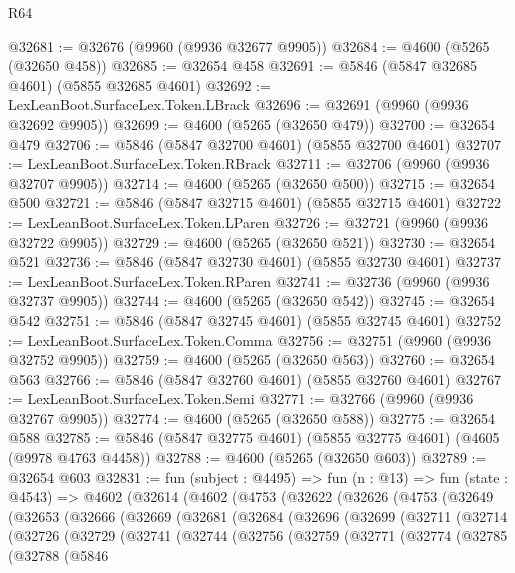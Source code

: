\begin{lexlean}{R64}
\begin{coremodule}
@32681 := @32676 (@9960 (@9936 @32677 @9905))
@32684 := @4600 (@5265 (@32650 @458))
@32685 := @32654 @458
@32691 := @5846 (@5847 @32685 @4601) (@5855 @32685 @4601)
@32692 := LexLeanBoot.SurfaceLex.Token.LBrack
@32696 := @32691 (@9960 (@9936 @32692 @9905))
@32699 := @4600 (@5265 (@32650 @479))
@32700 := @32654 @479
@32706 := @5846 (@5847 @32700 @4601) (@5855 @32700 @4601)
@32707 := LexLeanBoot.SurfaceLex.Token.RBrack
@32711 := @32706 (@9960 (@9936 @32707 @9905))
@32714 := @4600 (@5265 (@32650 @500))
@32715 := @32654 @500
@32721 := @5846 (@5847 @32715 @4601) (@5855 @32715 @4601)
@32722 := LexLeanBoot.SurfaceLex.Token.LParen
@32726 := @32721 (@9960 (@9936 @32722 @9905))
@32729 := @4600 (@5265 (@32650 @521))
@32730 := @32654 @521
@32736 := @5846 (@5847 @32730 @4601) (@5855 @32730 @4601)
@32737 := LexLeanBoot.SurfaceLex.Token.RParen
@32741 := @32736 (@9960 (@9936 @32737 @9905))
@32744 := @4600 (@5265 (@32650 @542))
@32745 := @32654 @542
@32751 := @5846 (@5847 @32745 @4601) (@5855 @32745 @4601)
@32752 := LexLeanBoot.SurfaceLex.Token.Comma
@32756 := @32751 (@9960 (@9936 @32752 @9905))
@32759 := @4600 (@5265 (@32650 @563))
@32760 := @32654 @563
@32766 := @5846 (@5847 @32760 @4601) (@5855 @32760 @4601)
@32767 := LexLeanBoot.SurfaceLex.Token.Semi
@32771 := @32766 (@9960 (@9936 @32767 @9905))
@32774 := @4600 (@5265 (@32650 @588))
@32775 := @32654 @588
@32785 := @5846 (@5847 @32775 @4601) (@5855 @32775 @4601) (@4605 (@9978 @4763 @4458))
@32788 := @4600 (@5265 (@32650 @603))
@32789 := @32654 @603
@32831 := fun (subject : @4495) =>
  fun (n : @13) =>
  fun (state : @4543) =>
  @4602
    (@32614
      (@4602
        (@4753
          (@32622
            (@32626
              (@4753
                (@32649
                  (@32653
                    (@32666
                      (@32669
                        (@32681
                          (@32684
                            (@32696
                              (@32699
                                (@32711
                                  (@32714
                                    (@32726
                                      (@32729
                                        (@32741
                                          (@32744
                                            (@32756
                                              (@32759
                                                (@32771
                                                  (@32774
                                                    (@32785
                                                      (@32788
                                                        (@5846

\end{coremodule}
\end{lexlean}
